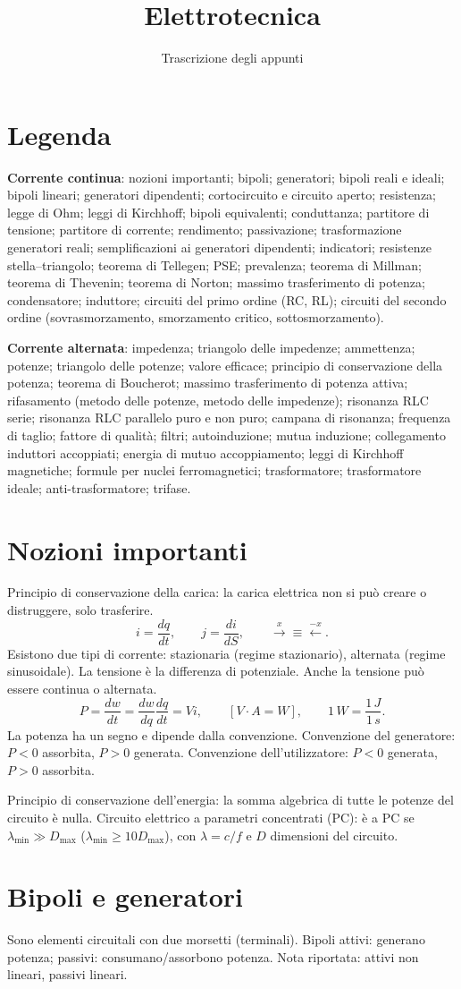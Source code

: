 \documentclass[11pt,a4paper]{article}
\title{Elettrotecnica}\author{Trascrizione degli appunti}\date{}
\newcommand{\pagina}[2]{\clearpage\section*{#2}}
\begin{document}
\maketitle
\pagina{1}{Legenda}
\textbf{Corrente continua}: nozioni importanti; bipoli; generatori; bipoli reali e ideali; bipoli lineari; generatori dipendenti; cortocircuito e circuito aperto; resistenza; legge di Ohm; leggi di Kirchhoff; bipoli equivalenti; conduttanza; partitore di tensione; partitore di corrente; rendimento; passivazione; trasformazione generatori reali; semplificazioni ai generatori dipendenti; indicatori; resistenze stella--triangolo; teorema di Tellegen; PSE; prevalenza; teorema di Millman; teorema di Thevenin; teorema di Norton; massimo trasferimento di potenza; condensatore; induttore; circuiti del primo ordine (RC, RL); circuiti del secondo ordine (sovrasmorzamento, smorzamento critico, sottosmorzamento).

\textbf{Corrente alternata}: impedenza; triangolo delle impedenze; ammettenza; potenze; triangolo delle potenze; valore efficace; principio di conservazione della potenza; teorema di Boucherot; massimo trasferimento di potenza attiva; rifasamento (metodo delle potenze, metodo delle impedenze); risonanza RLC serie; risonanza RLC parallelo puro e non puro; campana di risonanza; frequenza di taglio; fattore di qualità; filtri; autoinduzione; mutua induzione; collegamento induttori accoppiati; energia di mutuo accoppiamento; leggi di Kirchhoff magnetiche; formule per nuclei ferromagnetici; trasformatore; trasformatore ideale; anti-trasformatore; trifase.
\pagina{2}{Nozioni importanti}
Principio di conservazione della carica: la carica elettrica non si può creare o distruggere, solo trasferire.
\[i=\frac{dq}{dt},\qquad j=\frac{di}{dS},\qquad \xrightarrow{x}\equiv\xleftarrow{-x}.\]
Esistono due tipi di corrente: stazionaria (regime stazionario), alternata (regime sinusoidale). La tensione è la differenza di potenziale. Anche la tensione può essere continua o alternata.
\[P=\frac{dw}{dt}=\frac{dw}{dq}\frac{dq}{dt}=Vi,\qquad [V\cdot A=W],\qquad 1\,W=\frac{1\,J}{1\,s}.\]
La potenza ha un segno e dipende dalla convenzione. Convenzione del generatore: $P<0$ assorbita, $P>0$ generata. Convenzione dell'utilizzatore: $P<0$ generata, $P>0$ assorbita.

Principio di conservazione dell'energia: la somma algebrica di tutte le potenze del circuito è nulla. Circuito elettrico a parametri concentrati (PC): è a PC se $\lambda_{\min}\gg D_{\max}$ ($\lambda_{\min}\geq10D_{\max}$), con $\lambda=c/f$ e $D$ dimensioni del circuito.
\pagina{3}{Bipoli e generatori}
Sono elementi circuitali con due morsetti (terminali). Bipoli attivi: generano potenza; passivi: consumano/assorbono potenza. Nota riportata: attivi non lineari, passivi lineari.
\end{document}
